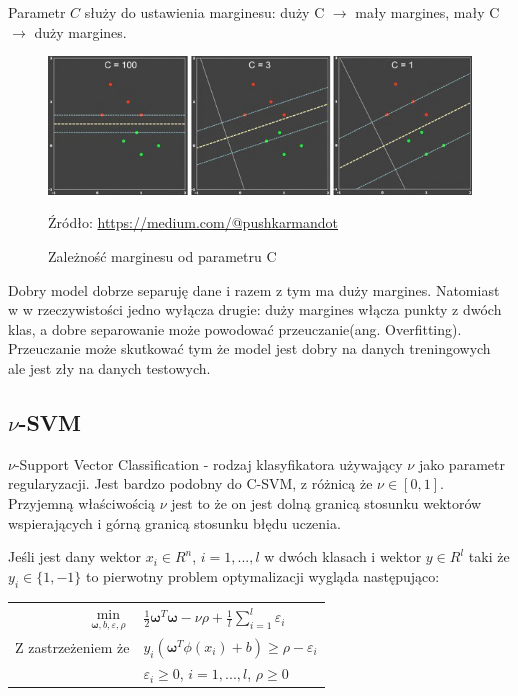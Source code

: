 \documentclass[paper=a4, fontsize=11pt]{scrartcl} %
\numberwithin{equation}{section} %
\numberwithin{figure}{section} %
\newcommand*{\captionsource}[2]{%
  \caption[{#1}]{%
      #1}
    Źródło: #2%
}
\begin{document}
    \par Parametr $C$ służy do ustawienia marginesu: duży C $\rightarrow$ mały margines,
    mały C $\rightarrow$ duży margines.

    \begin{figure}[h]
        \begin{center}
            \includegraphics[scale=0.8]{./img/param_c.png}
            \captionsource{Zależność marginesu od parametru C}{\url{https://medium.com/@pushkarmandot}}
            \label{fig:param_c}
        \end{center}
    \end{figure}

    \par Dobry model dobrze separuję dane i razem z tym ma duży margines. Natomiast w
    w rzeczywistości jedno wyłącza drugie: duży margines włącza punkty z dwóch klas, a
    dobre separowanie może powodować przeuczanie(ang. Overfitting). Przeuczanie może 
    skutkować tym że model jest dobry na danych treningowych ale jest zły na danych testowych.

\newpage %
\subsection{$\nu$-SVM}
    \par $\nu$-Support Vector Classification - rodzaj klasyfikatora używający $\nu$ jako
    parametr regularyzacji. Jest bardzo podobny do C-SVM, z różnicą że $\nu\in[0,1]$.
    Przyjemną właściwością $\nu$ jest to że on jest dolną granicą stosunku wektorów
    wspierających i górną granicą stosunku błędu uczenia.
    \par Jeśli jest dany wektor $x_i \in R^n$, $i=1,...,l$ w dwóch klasach i wektor
    $y\in R^l$ taki że $y_i \in \{1, -1\}$ to pierwotny problem optymalizacji wygląda
    następująco:

    \begin{center}
        \begin{tabular}{rl}
            $\min\limits_{\pmb{\omega},b,\varepsilon, \rho}$ &
            $\frac{1}{2}\pmb{\omega}^T\pmb{\omega} - \nu\rho + \frac{1}{l}\sum\limits_{i=1}^{l}
            \varepsilon_i$ \\
            Z zastrzeżeniem że & $y_i(\pmb{\omega}^T\phi(x_i) + b) \geq \rho - \varepsilon_i$ \\
                               & $\varepsilon_i \geq 0$, $i=1,...,l$, $\rho \geq 0$
        \end{tabular}
    \end{center}
\end{document}
